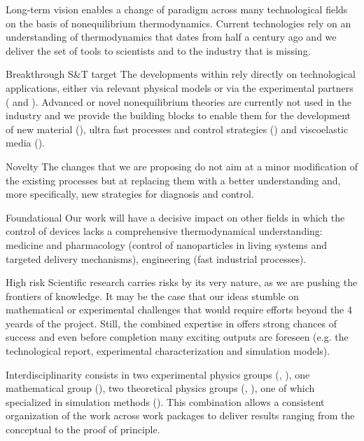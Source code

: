 \begin{compactdesc}
\item[Long-term vision] \TheProject enables a change of paradigm across many technological
fields on the basis of nonequilibrium thermodynamics. Current technologies rely on an
understanding of thermodynamics that dates from half a century ago and we deliver the
set of tools to scientists and to the industry that is missing.
\item[Breakthrough S\&T target] The developments within \TheProject rely directly on
technological applications, either via relevant physical models or via the experimental
partners ( and ). Advanced or novel nonequilibrium theories are
currently not used in the industry and we provide the building blocks to enable them
for the development of new material (), ultra fast processes
and control strategies () and viscoelastic media ().
\item[Novelty] The changes that we are proposing do not aim at a minor modification of the
existing processes but at replacing them with a better understanding and, more specifically,
new strategies for diagnosis and control.
\item[Foundational] Our work will have a decisive impact on other fields in which the
control of devices lacks a comprehensive thermodynamical understanding: medicine and
pharmacology (control of nanoparticles in living systems and targeted delivery mechanisms),
engineering (fast industrial processes).
\item[High risk] Scientific research carries risks by its very nature, as we are pushing the
frontiers of knowledge. It may be the case that our ideas stumble on mathematical or
experimental challenges that would require efforts beyond the 4 yeards of the
project. Still, the combined expertise in \TheProject offers strong chances of success and
even before completion many exciting outputs are foreseen (e.g. the technological report,
experimental characterization and simulation models).
\item[Interdisciplinarity] \TheProject consists in two experimental physics groups
(, ), one mathematical group (), two theoretical physics
groups (, ), one of which specialized in simulation methods
(). This combination allows a consistent organization of the work across work
packages to deliver results ranging from the conceptual to the proof of principle.
\end{compactdesc}

